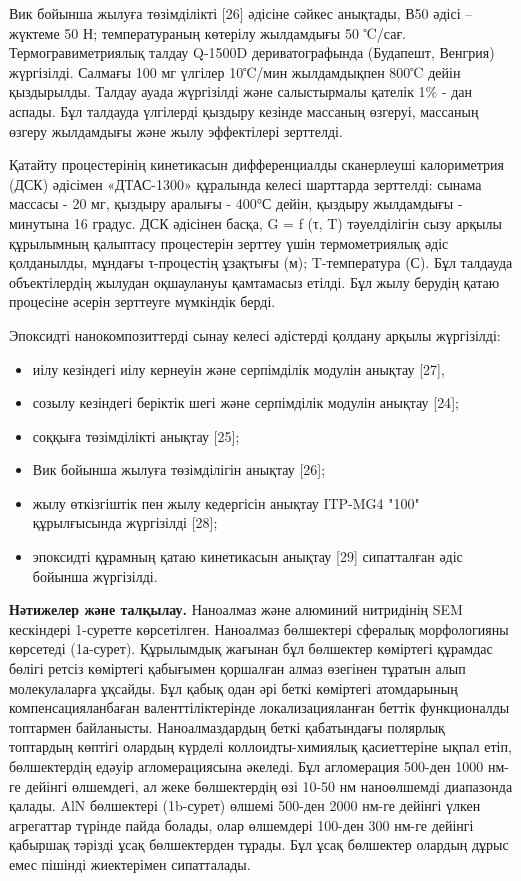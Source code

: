 \begin{multicols}{2}
Вик бойынша жылуға төзімділікті {[}26{]} әдісіне сәйкес анықтады, В50
әдісі -- жүктеме 50 Н; температураның көтерілу жылдамдығы 50 ℃/сағ.
Термогравиметриялық талдау Q-1500D дериватографында (Будапешт, Венгрия)
жүргізілді. Салмағы 100 мг үлгілер 10℃/мин жылдамдықпен 800℃ дейін
қыздырылды. Талдау ауада жүргізілді және салыстырмалы қателік 1\% - дан
аспады. Бұл талдауда үлгілерді қыздыру кезінде массаның өзгеруі,
массаның өзгеру жылдамдығы және жылу эффектілері зерттелді.

Қатайту процестерінің кинетикасын дифференциалды сканерлеуші
калориметрия (ДСК) әдісімен «ДТАС-1300» құралында келесі шарттарда
зерттелді: сынама массасы - 20 мг, қыздыру аралығы - 400°С дейін,
қыздыру жылдамдығы - минутына 16 градус. ДСК әдісінен басқа, G = f (τ,
T) тәуелділігін сызу арқылы құрылымның қалыптасу процестерін зерттеу
үшін термометриялық әдіс қолданылды, мұндағы τ-процестің ұзақтығы (м);
T-температура (С). Бұл талдауда объектілердің жылудан оқшаулануы
қамтамасыз етілді. Бұл жылу берудің қатаю процесіне әсерін зерттеуге
мүмкіндік берді.

Эпоксидті нанокомпозиттерді сынау келесі әдістерді қолдану арқылы
жүргізілді:

\begin{itemize}
\item
  иілу кезіндегі иілу кернеуін және серпімділік модулін анықтау
  {[}27{]},
\item
  созылу кезіндегі беріктік шегі және серпімділік модулін анықтау
  {[}24{]};
\item
  соққыға төзімділікті анықтау {[}25{]};
\item
  Вик бойынша жылуға төзімділігін анықтау {[}26{]};
\item
  жылу өткізгіштік пен жылу кедергісін анықтау ITP-MG4 "100"
  құрылғысында жүргізілді {[}28{]};
\item
  эпоксидті құрамның қатаю кинетикасын анықтау {[}29{]} сипатталған әдіс
  бойынша жүргізілді.
\end{itemize}

{\bfseries Нәтижелер және талқылау.} Наноалмаз және алюминий нитридінің SEM
кескіндері 1-суретте көрсетілген. Наноалмаз бөлшектері сфералық
морфологияны көрсетеді (1а-сурет). Құрылымдық жағынан бұл бөлшектер
көміртегі құрамдас бөлігі ретсіз көміртегі қабығымен қоршалған алмаз
өзегінен тұратын алып молекулаларға ұқсайды. Бұл қабық одан әрі беткі
көміртегі атомдарының компенсацияланбаған валенттіліктерінде
локализацияланған беттік функционалды топтармен байланысты.
Наноалмаздардың беткі қабатындағы полярлық топтардың көптігі олардың
күрделі коллоидты-химиялық қасиеттеріне ықпал етіп, бөлшектердің едәуір
агломерациясына әкеледі. Бұл агломерация 500-ден 1000 нм-ге дейінгі
өлшемдегі, ал жеке бөлшектердің өзі 10-50 нм наноөлшемді диапазонда
қалады. AlN бөлшектері (1b-сурет) өлшемі 500-ден 2000 нм-ге дейінгі
үлкен агрегаттар түрінде пайда болады, олар өлшемдері 100-ден 300 нм-ге
дейінгі қабыршақ тәрізді ұсақ бөлшектерден тұрады. Бұл ұсақ бөлшектер
олардың дұрыс емес пішінді жиектерімен сипатталады.


\end{multicols}
